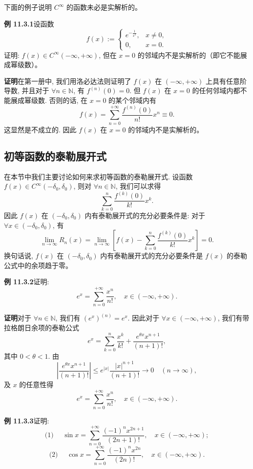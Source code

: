 \documentclass[UTF8, 12pt, fontset=fandol, oneside]{ctexart}
\begin{document}
下面的例子说明 $C^\infty$ 的函数未必是实解析的。

\noindent\textbf{例 11.3.1}\quad 设函数
\[
  f(x):=
  \begin{cases}
    e^{-\frac1{x^2}}, & x\ne0,\\
    0, & x=0.
  \end{cases}
\]
证明: $f(x)\in C^\infty(-\infty,+\infty)$, 但在 $x=0$ 的邻域内不是实解析的（即它不能展成幂级数）。

\noindent\textbf{证明}\quad 在第一册中, 我们用洛必达法则证明了 $f(x)$ 在 $(-\infty,+\infty)$ 上具有任意阶导数, 并且对于 $\forall n\in\mathbb N$, 有 $f^{(n)}(0)=0$. 但 $f(x)$ 在 $x=0$ 的任何邻域内都不能展成幂级数. 否则的话, 在 $x=0$ 的某个邻域内有
\[
  f(x)=\sum_{n=0}^{+\infty}\frac{f^{(n)}(0)}{n!}x^n\equiv0.
\]
这显然是不成立的. 因此 $f(x)$ 在 $x=0$ 的邻域内不是实解析的。

\subsection{初等函数的泰勒展开式}

在本节中我们主要讨论如何来求初等函数的泰勒展开式. 设函数
$f(x)\in C^\infty(-\delta_0,\delta_0)$, 则对 $\forall n\in\mathbb N$, 我们可以求得
\[
  \sum_{k=0}^{n}\frac{f^{(k)}(0)}{k!}x^k.
\]
因此 $f(x)$ 在 $(-\delta_0,\delta_0)$ 内有泰勒展开式的充分必要条件是: 对于 $\forall x\in(-\delta_0,\delta_0)$, 有
\[
  \lim_{n\to\infty}R_n(x)
  =
  \lim_{n\to\infty}
  \left[
    f(x)-\sum_{k=0}^{n}\frac{f^{(k)}(0)}{k!}x^k
  \right]
  =0.
\]
换句话说, $f(x)$ 在 $(-\delta_0,\delta_0)$ 内有泰勒展开式的充分必要条件是 $f(x)$ 的泰勒公式中的余项趋于零。

\noindent\textbf{例 11.3.2}\quad 证明:
\[
  e^x=\sum_{n=0}^{+\infty}\frac{x^n}{n!},
  \quad x\in(-\infty,+\infty).
\]

\noindent\textbf{证明}\quad 对于 $\forall n\in\mathbb N$, 我们有 $(e^x)^{(n)}=e^x$. 因此对于 $\forall x\in(-\infty,+\infty)$, 我们有带拉格朗日余项的泰勒公式
\[
  e^x=\sum_{k=0}^{n}\frac{x^k}{k!}
  +\frac{e^{\theta x}x^{n+1}}{(n+1)!},
\]
其中 $0<\theta<1$. 由
\[
  \left|\frac{e^{\theta x}x^{n+1}}{(n+1)!}\right|
  \leqslant
  e^{|x|}\frac{|x|^{n+1}}{(n+1)!}
  \to0\quad(n\to\infty),
\]
及 $x$ 的任意性得
\[
  e^x=\sum_{n=0}^{+\infty}\frac{x^n}{n!},
  \quad x\in(-\infty,+\infty).
\]

\noindent\textbf{例 11.3.3}\quad 证明:
\[
  \text{(1) }\quad
  \sin x=\sum_{n=0}^{+\infty}\frac{(-1)^nx^{2n+1}}{(2n+1)!},
  \quad x\in(-\infty,+\infty);
\]
\[
  \text{(2) }\quad
  \cos x=\sum_{n=0}^{+\infty}\frac{(-1)^nx^{2n}}{(2n)!},
  \quad x\in(-\infty,+\infty).
\]
\end{document}
